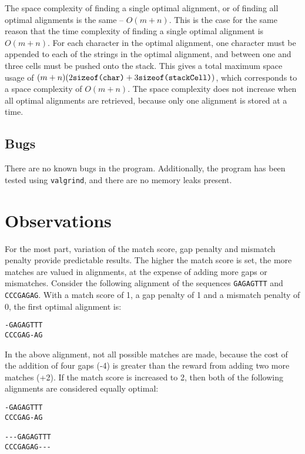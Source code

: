 \documentclass[a4paper]{report}
\begin{document}
The space complexity of finding a single optimal alignment, or of finding all optimal
alignments is the same -- $O(m + n)$. This is the case for the same reason that the time
complexity of finding a single optimal alignment is $O(m + n)$. For each character in the
optimal alignment, one character must be appended to each of the strings in the optimal alignment,
and between one and three cells must be pushed onto the stack. This gives a total maximum
space usage of $(m + n)(2 \verb=sizeof(char)= + 3 \verb=sizeof(stackCell)=)$, which corresponds to a space
complexity of $O(m + n)$. The space complexity does not increase when all optimal alignments are
retrieved, because only one alignment is stored at a time.



\subsection*{Bugs}

There are no known bugs in the program. Additionally, the program
has been tested using \verb=valgrind=, and there are no memory leaks present.

\section*{Observations}

For the most part, variation of the match score, gap penalty and mismatch penalty provide
predictable results. The higher the match score is set, the more matches are valued in alignments, at
the expense of adding more gaps or mismatches. Consider the following alignment of the sequences
\verb=GAGAGTTT= and \verb=CCCGAGAG=. With a match score of 1, a gap penalty of 1 and a mismatch penalty of
0, the first optimal alignment is:

\begin{verbatim}
-GAGAGTTT
CCCGAG-AG
\end{verbatim}

In the above alignment, not all possible matches are made, because the cost of the addition of four gaps (-4) is
greater than the reward from adding two more matches (+2). If the match score is increased to 2, then both of the
following alignments are considered equally optimal:

\begin{verbatim}
-GAGAGTTT
CCCGAG-AG

---GAGAGTTT
CCCGAGAG---
\end{verbatim}
\end{document}
